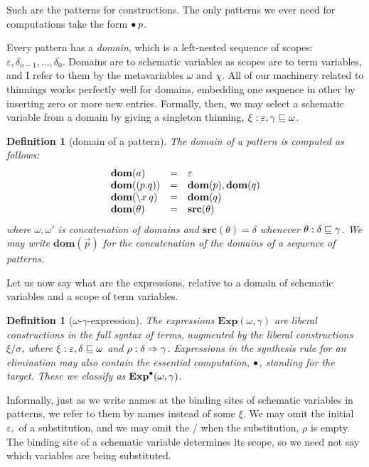\documentclass{jfp1}
\newtheorem{definition}[theorem]{Definition}
\newcommand{\emp}{\varepsilon}
\begin{document}
Such are the patterns for constructions. The only patterns we ever need for
computations take the form $\bullet\:p$.

Every pattern has a \emph{domain}, which is a left-nested sequence of
scopes: $\emp,\delta_{n-1},\ldots,\delta_0$. Domains are to schematic variables
as scopes are to term variables, and I refer to them by the
metavariables $\omega$ and $\chi$. All of our machinery related to thinnings works
perfectly well for domains, embedding one sequence in other by inserting
zero or more new entries. Formally, then, we may select a schematic variable
from a domain by giving a singleton thinning, $\xi : \emp,\gamma \thin \omega$.

\newcommand{\dom}[1]{\textbf{dom}(#1)}
\newcommand{\src}[1]{\textbf{src}(#1)}
\begin{definition}[domain of a pattern]
  The \emph{domain} of a pattern is computed as follows:
  \[\begin{array}{lcl}
      \dom a & = & \emp \\
      \dom{(p.q)} & = & \dom{p},\dom{q} \\
      \dom{\la xq} & = & \dom{q} \\
      \dom{\theta} & = & \src{\theta}
    \end{array}\]
  where $\omega,\omega'$ is concatenation of domains and $\src{\theta} = \delta$ whenever
  $\theta : \delta\sqsubseteq\gamma$.
  We may write $\dom{\vec p}$ for the concatenation of the domains of a sequence
  of patterns.
\end{definition}

Let us now say what are the expressions, relative to a domain of schematic variables and
a scope of term variables.

\newcommand{\Exp}[2]{\textbf{Exp}(#1,#2)}
\newcommand{\Expo}[2]{\textbf{Exp}^\trg(#1,#2)}
\begin{definition}[$\omega$-$\gamma$-expression]
  The expressions $\Exp\omega\gamma$ are liberal constructions in the full syntax of
  terms, augmented by the liberal constructions $\xi/\sigma$, where
  $\xi : \emp,\delta \thin \omega$ and $\rho : \delta\Rightarrow\gamma$.
  Expressions in the synthesis rule for an elimination may also contain the
  essential computation, $\bullet$, standing for the target. These we classify
  as $\Expo\omega\gamma$.
\end{definition}

Informally, just as we write names at the binding sites of schematic variables
in patterns, we refer to them by names instead of some $\xi$. We may omit the
initial $\emp,$ of a substitution, and we may omit the $/$ when the substitution, $\rho$ is
empty. The binding site of a schematic variable determines its scope, so we
need not say which variables are being substituted.
\end{document}
